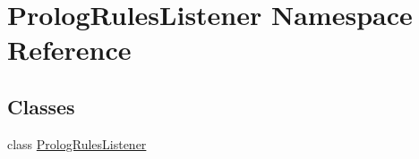 \hypertarget{namespace_prolog_rules_listener}{}\section{Prolog\+Rules\+Listener Namespace Reference}
\label{namespace_prolog_rules_listener}
\subsection*{Classes}
\begin{DoxyCompactItemize}
\item 
class \hyperlink{class_prolog_rules_listener_1_1_prolog_rules_listener}{Prolog\+Rules\+Listener}
\end{DoxyCompactItemize}
